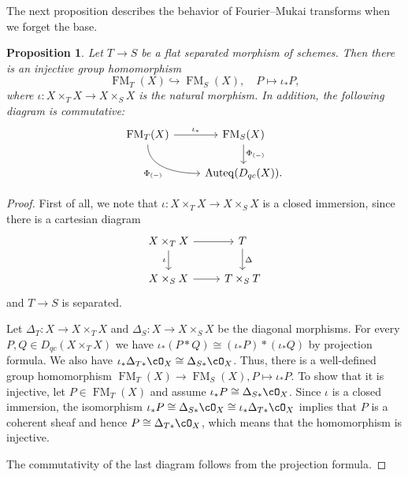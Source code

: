 \documentclass{amsart}
\numberwithin{equation}{section}
\theoremstyle{plain}
\newtheorem{proposition}[theorem]{Proposition}
\theoremstyle{definition}
\DeclareMathOperator{\Auteq}{\mathrm{Auteq}}
\DeclareMathOperator{\FM}{\mathrm{FM}}
\begin{document}
The next proposition describes the behavior of Fourier--Mukai transforms when we forget the base.
\begin{proposition}\label{prpo:forget-base}
    Let $T \to S$ be a flat separated morphism of schemes.
    Then there is an injective group homomorphism
    \begin{equation}
        \FM_T(X) \hookrightarrow \FM_S(X), \quad P \mapsto \iota_*P,
    \end{equation}
    where $\iota \colon X \times_T X \to X \times_S X$ is the natural morphism.
    In addition, the following diagram is commutative:
    \[
        \begin{tikzcd}
            \FM_T(X) \ar[r, "\iota_*"] \ar[rd, out=-90, in=180, "\Phi_{(-)}"'] & \FM_S(X) \ar[d, "\Phi_{(-)}"] \\
            & \Auteq(D_{qc}(X)).
        \end{tikzcd}
    \]
\end{proposition}
\begin{proof}
    First of all, we note that $\iota \colon X \times_T X \to X \times_S X$ is a closed immersion, since there is a cartesian diagram
    \[
        \begin{tikzcd}
            X \times_T X \ar[r] \ar[d, "\iota"'] & T \ar[d, "\Delta"]\\
            X \times_S X \ar[r] & T \times_S T
        \end{tikzcd}
    \]
    and $T \to S$ is separated.


    Let $\Delta_T \colon X \to X \times_T X$ and $\Delta_S \colon X \to X \times_S X$ be the diagonal morphisms.
    For every $P, Q \in D_{qc}(X \times_T X)$ we have $\iota_*(P * Q) \cong (\iota_*P) * (\iota_*Q)$ by projection formula. We also have $\iota_* \Delta_{T*}\cO_X \cong \Delta_{S*}\cO_X$.
    Thus, there is a well-defined group homomorphism  $\FM_T(X) \to \FM_S(X), P \mapsto \iota_*P$.
    To show that it is injective, let $P \in \FM_T(X)$ and assume $\iota_* P \cong \Delta_{S*}\cO_X$.
    Since $\iota$ is a closed immersion, the isomorphism $\iota_* P \cong \Delta_{S*}\cO_X \cong \iota_*\Delta_{T*}\cO_X$ implies that $P$ is a coherent sheaf and hence $P \cong \Delta_{T*}\cO_X$, which means that the homomorphism is injective.

    The commutativity of the last diagram follows from the projection formula.
\end{proof}
\end{document}
